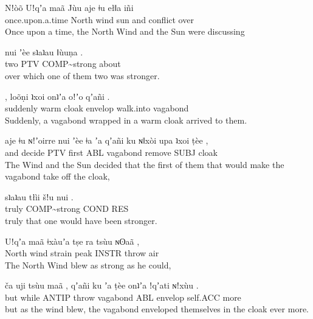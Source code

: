 \begin{exe}
 \ex 
{} {Nǃòõ} {Uǃqʼa} {maã} {Jùu} {aje} {ǂu} {ełǁa} {iñi}\\ 
once.upon.a.time North wind  sun  and conflict over\\ 
\glt Once upon a time, the North Wind and the Sun were discussing
\end{exe}

\begin{exe}
 \ex 
{} {nui} {ʼèe} {sʇaʇau} {ǁùuṇa} .\\ 
two  PTV COMP\textasciitilde{}strong about {}\\ 
\glt over which one of them two was stronger.
\end{exe}

\begin{exe}
 \ex 
{} , {loõṇi} {ʇxoi} {onʇʼa} {oǃʼo} {qʼañi} .\\ 
suddenly {} warm cloak envelop walk.into vagabond {}\\ 
\glt Suddenly, a vagabond wrapped in a warm cloak arrived to them.
\end{exe}

\begin{exe}
 \ex 
{} {aje} {ǂu} {ɴǃʼoirre} {nui} {ʼèe} {ǂa} {ʼa} {qʼañi} {ku} {ɴǁxòi} {upa} {ʇxoi} {ṭèe} ,\\ 
  and decide  PTV first ABL vagabond  remove SUBJ cloak  {}\\ 
\glt The Wind and the Sun decided that the first of them that would make the vagabond take off the cloak,
\end{exe}

\begin{exe}
 \ex 
{} {sʇaʇau} {tłìi} {šǃu} {nui} .\\ 
truly COMP\textasciitilde{}strong COND RES  {}\\ 
\glt truly that one would have been stronger.
\end{exe}

\begin{exe}
 \ex 
{} {Uǃqʼa} {maã} {ǂxàuʼa} {tṣe} {ra} {tsùu} {ɴʘaã} ,\\ 
North wind  strain peak INSTR throw air {}\\ 
\glt The North Wind blew as strong as he could,
\end{exe}

\begin{exe}
 \ex 
{} {ča} {uji} {tsùu} {maã} , {qʼañi} {ku} {ʼa} {ṭèe} {onʇʼa} {ǃqʼati} {ɴǃxùu} .\\ 
but while ANTIP throw  {} vagabond  ABL  envelop self.ACC more {}\\ 
\glt but as the wind blew, the vagabond enveloped themselves in the cloak ever more.
\end{exe}

